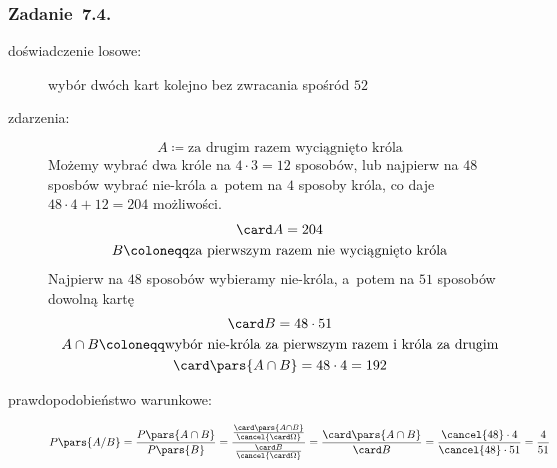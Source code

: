 \subsubsection*{Zadanie~7.4.}
\begin{description}
    \item[doświadczenie losowe:] wybór dwóch kart kolejno bez zwracania spośród \(52\)
    \item[zdarzenia:]
        \begin{equation*}
            A \coloneqq \text{za drugim razem wyciągnięto króla}
        \end{equation*}
        Możemy wybrać dwa króle na \(4 \cdot 3 = 12\) sposobów, lub najpierw na \(48\) sposbów wybrać nie-króla a~potem na \(4\) sposoby króla, co daje \(48 \cdot 4 + 12 = 204\) możliwości.
        \begin{gather*}
            \card A = 204\\
            B \coloneqq \text{za pierwszym razem nie wyciągnięto króla}
        \end{gather*}
        Najpierw na \(48\) sposobów wybieramy nie-króla, a~potem na \(51\) sposobów dowolną kartę
        \begin{gather*}
            \card B = 48 \cdot 51\\
            A \cap B \coloneqq \text{wybór nie-króla za pierwszym razem i~króla za drugim}\\
            \card\pars{A \cap B} = 48 \cdot 4 = 192
        \end{gather*}
    \item[prawdopodobieństwo warunkowe:]
        \begin{equation*}
            P\pars{A / B}
                = \frac{P\pars{A \cap B}}{P\pars{B}}
                = \frac{\frac{\card\pars{A \cap B}}{\cancel{\card\Omega}}}{\frac{\card B}{\cancel{\card\Omega}}}
                = \frac{\card\pars{A \cap B}}{\card B}
                = \frac{\cancel{48} \cdot 4}{\cancel{48} \cdot 51}
                = \frac{4}{51}
        \end{equation*}
\end{description}
